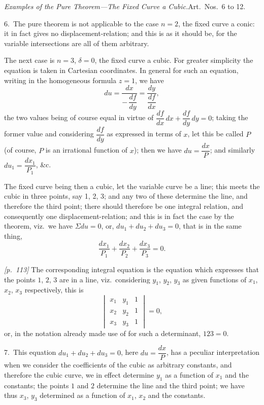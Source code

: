 \documentclass[11pt,a4paper]{article}
\theoremstyle{plain}
\theoremstyle{definition}
\theoremstyle{remark}
\begin{document}
\textit{Examples of the Pure Theorem---The Fixed Curve a Cubic.}\quad Art.\ Nos.~6 to 12.

6.\ The pure theorem is not applicable to the case $n = 2$, the fixed curve a conic: it in fact gives no displacement-relation; and this is as it should be, for the variable intersections are all of them arbitrary.

The next case is $n = 3$, $\delta = 0$, the fixed curve a cubic. For greater simplicity the equation is taken in Cartesian coordinates. In general for such an equation, writing in the homogeneous formula $z = 1$, we have
\[
du = \frac{dx}{-\,\dfrac{df}{dy}} = \frac{dy}{\dfrac{df}{dx}},
\]
the two values being of course equal in virtue of $\dfrac{df}{dx}\,dx + \dfrac{df}{dy}\,dy = 0$; taking the former value and considering $\dfrac{df}{dy}$ as expressed in terms of $x$, let this be called $P$ (of course, $P$ is an irrational function of $x$); then we have $du = \dfrac{dx}{P}$; and similarly $du_1 = \dfrac{dx_1}{P_1}$, \&c.

The fixed curve being then a cubic, let the variable curve be a line; this meets the cubic in three points, say 1, 2, 3; and any two of these determine the line, and therefore the third point; there should therefore be one integral relation, and consequently one displacement-relation; and this is in fact the case by the theorem, viz.\ we have $\Sigma du = 0$, or, $du_1 + du_2 + du_3 = 0$, that is in the same thing,
\[
\frac{dx_1}{P_1} + \frac{dx_2}{P_2} + \frac{dx_3}{P_3} = 0.
\]

\noindent\textit{[p.~113]} The corresponding integral equation is the equation which expresses that the points $1$, $2$, $3$ are in a line, viz.\ considering $y_1$, $y_2$, $y_3$ as given functions of $x_1$, $x_2$, $x_3$ respectively, this is
\[
\begin{vmatrix}
x_1 & y_1 & 1 \\
x_2 & y_2 & 1 \\
x_3 & y_3 & 1
\end{vmatrix} = 0,
\]
or, in the notation already made use of for such a determinant, $123 = 0$.

\bigskip

7.\ This equation $du_1 + du_2 + du_3 = 0$, here $du = \dfrac{dx}{P}$, has a peculiar interpretation when we consider the coefficients of the cubic as arbitrary constants, and therefore the cubic curve, we in effect determine $y_1$ as a function of $x_1$ and the constants; the points $1$ and $2$ determine the line and the third point; we have thus $x_3$, $y_3$ determined as a function of $x_1$, $x_2$ and the constants.
\end{document}
